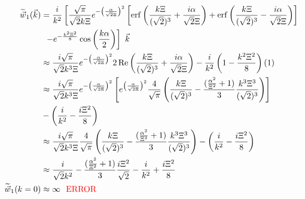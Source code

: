 \documentclass[double,12pt]{beavtex}
\begin{document}
\begin{align}
   \widetilde{\vec{w}}_1(\vec{k}) &= \frac{i}{k^2}\left[\frac{\sqrt{\pi}}{\sqrt{2}k\Xi}
   e^{-\left(\frac{\alpha}{\sqrt{2}\Xi}\right)^2}\left[\operatorname{erf}
   \left(\frac{k\Xi}{(\sqrt{2})^3}+\frac{i\alpha}{\sqrt{2}\Xi}\right)
   +\operatorname{erf}\left(\frac{k\Xi}{(\sqrt{2})^3}-\frac{i\alpha}{\sqrt{2}\Xi}
   \right)\right]\color{white}\right]\color{black}  \nonumber \\
 & \color{white}\left[\color{black}-e^{-\frac{k^2\Xi^2}{8}}\cos\left(\frac{k\alpha}{2}\right)\right]{~}\color{black}\vec{k} \\
    & \approx  \frac{i\sqrt{\pi}}{\sqrt{2}k^3\Xi}e^{-\left(\frac{\alpha}{\sqrt{2}\Xi}\right)^2}2\operatorname{Re}\left(\frac{k\Xi}{(\sqrt{2})^3}+\frac{i\alpha}{\sqrt{2}\Xi}\right) -\frac{i}{k^2}\left(1-\frac{k^2\Xi^2}{8}\right)\left(1\right) \\
    & \approx  \frac{i\sqrt{\pi}}{\sqrt{2}k^3\Xi}e^{-\left(\frac{\alpha}{\sqrt{2}\Xi}\right)^2}\left[e^{\left(\frac{\alpha}{\sqrt{2}\Xi}\right)^2}\frac{4}{\sqrt{\pi}}\left(\frac{k\Xi}{(\sqrt{2})^3} -\frac{(\frac{\alpha^2}{\Xi^2}+1)}{3}\frac{k^3\Xi^3}{(\sqrt{2})^3}\right)\right] \nonumber \\
    &-\left(\frac{i}{k^2}-\frac{i\Xi^2}{8}\right) \\
    & \approx  \frac{i\sqrt{\pi}}{\sqrt{2}k^3\Xi}\frac{4}{\sqrt{\pi}}\left(\frac{k\Xi}{(\sqrt{2})^3} -\frac{(\frac{\alpha^2}{\Xi^2}+1)}{3}\frac{k^3\Xi^3}{(\sqrt{2})^3}\right)-\left(\frac{i}{k^2}-\frac{i\Xi^2}{8}\right) \\
    & \approx  \frac{i}{\sqrt{2}k^2} -\frac{(\frac{\alpha^2}{\Xi^2}+1)}{3}\frac{i\Xi^2}{\sqrt{2}}-\frac{i}{k^2}+\frac{i\Xi^2}{8} \\
     \widetilde{\vec w}_1(k=0) & \approx  \infty    \mbox{\textcolor{red}{~~ERROR}}
\end{align}
\end{document}
